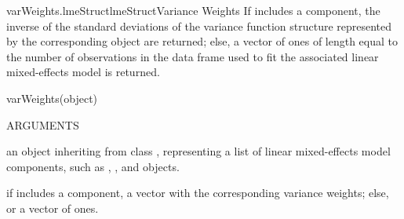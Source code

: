 \documentclass[pdftex]{article} \usepackage{url,graphicx}
\begin{document}
\begin{Helpfile}{varWeights.lmeStruct}{lmeStructVariance Weights}
If  includes a  component, the inverse of
the standard deviations of the variance function structure represented
by the corresponding  object are returned; else, a
vector of ones of length equal to the number of observations in the
data frame used to fit the associated linear mixed-effects model is
returned.
\begin{Example}
varWeights(object)
\end{Example}
\begin{Argument}{ARGUMENTS}
\item[\Co{object:}]
an object inheriting from class ,
representing a list of linear mixed-effects model components, such as
, , and  objects.
\end{Argument}
if  includes a  component, a vector with
the corresponding variance weights; else, or a vector of ones.
\end{Helpfile}
\end{document}
